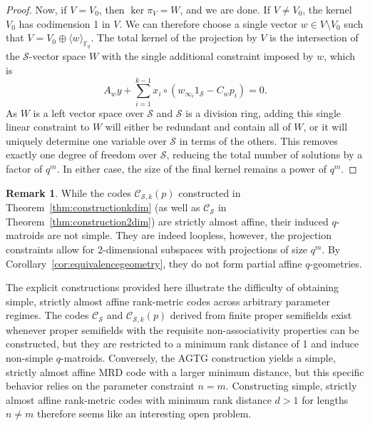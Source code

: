 \documentclass[a4paper,11pt,reqno]{article}
\newcommand{\C}{\mathcal{C}}
\renewcommand{\S}{\mathcal{S}}
\theoremstyle{plain} \numberwithin{equation}{section}
\theoremstyle{definition}
\newtheorem{remark}[theorem]{Remark}
\begin{document}
\begin{proof}
Now, if $V = V_0$, then $\ker \pi_V = W$, and we are done. If $V \neq V_0$, the kernel $V_0$ has codimension 1 in $V$. We can therefore choose a single vector $w \in V \setminus V_0$ such that $V = V_0 \oplus \langle w \rangle_{\mathbb{F}_q}$. The total kernel of the projection by $V$ is the intersection of the $\S$-vector space $W$ with the single additional constraint imposed by $w$, which is
\[
    A_w y + \sum^{k-1}_{i=1} x_i \circ (w_{\infty_i} 1_\S - C_w p_i)=0.
\]
As $W$ is a left vector space over $\S$ and $\S$ is a division ring, adding this single linear constraint to $W$ will either be redundant and contain all of $W$, or it will uniquely determine one variable over $\S$ in terms of the others. This removes exactly one degree of freedom over $\S$, reducing the total number of solutions by a factor of $q^m$. In either case, the size of the final kernel remains a power of $q^m$.
\end{proof}

\begin{remark}
While the codes $\C_{\S,k}(p)$ constructed in Theorem~\ref{thm:constructionkdim} (as well as $\C_\S$ in Theorem~\ref{thm:construction2dim}) are strictly almost affine, their induced $q$-matroids are not simple. They are indeed loopless, however, the projection constraints allow for $2$-dimensional subspaces with projections of size $q^m$. By Corollary~\ref{cor:equivalencegeometry}, they do not form partial affine $q$-geometries.
\end{remark}


The explicit constructions provided here illustrate the difficulty of obtaining simple, strictly almost affine rank-metric codes across arbitrary parameter regimes. The codes $\C_\S$ and $\C_{\S,k}(p)$ derived from finite proper semifields exist whenever proper semifields with the requisite non-associativity properties can be constructed, but they are restricted to a minimum rank distance of 1 and induce non-simple $q$-matroids. Conversely, the AGTG construction yields a simple, strictly almost affine MRD code with a larger minimum distance, but this specific behavior relies on the parameter constraint $n=m$. Constructing simple, strictly almost affine rank-metric codes with minimum rank distance $d>1$ for lengths $n\neq m$ therefore seems like an interesting open problem.




\end{document}
